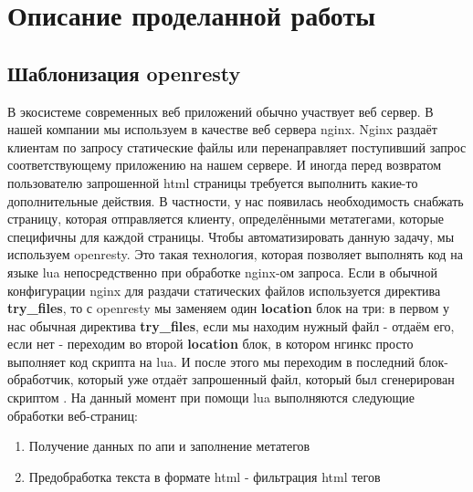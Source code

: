 \documentclass[a4papaer,12pt]{article}
\begin{document}
\section{Описание проделанной работы}

\subsection{Шаблонизация openresty}

В экосистеме современных веб приложений обычно участвует веб сервер.
В нашей компании мы используем в качестве веб сервера nginx.
Nginx раздаёт клиентам по запросу статические файлы или перенаправляет
поступивший запрос соответствующему приложению на нашем сервере.
И иногда перед возвратом пользователю запрошенной html страницы требуется
выполнить какие-то дополнительные действия. В частности, у нас появилась
необходимость снабжать страницу, которая отправляется клиенту, определёнными метатегами,
которые специфичны для каждой страницы. Чтобы автоматизировать данную задачу,
мы используем openresty\cite{openresty}. Это такая технология, которая позволяет выполнять код на
языке lua непосредственно при обработке nginx-ом запроса.
Если в обычной конфигурации nginx для раздачи статических файлов используется директива
\textbf{try\_files}, то с openresty мы заменяем один \textbf{location} блок на три:
в первом у нас обычная директива \textbf{try\_files}, если мы находим нужный файл
- отдаём его, если нет - переходим во второй \textbf{location} блок, в котором нгинкс
просто выполняет код скрипта на lua. И после этого мы переходим в последний блок-обработчик,
который уже отдаёт запрошенный файл, который был сгенерирован скриптом \cite{openresty_habr}.
На данный момент при помощи lua выполняются следующие обработки веб-страниц:

\begin{enumerate}
    \item Получение данных по апи и заполнение метатегов
    \item Предобработка текста в формате html - фильтрация html тегов
\end{enumerate}
\end{document}
